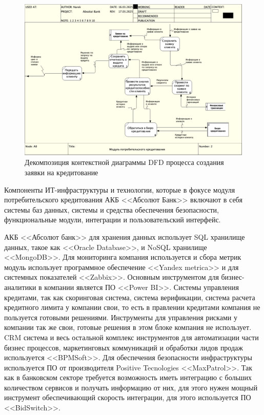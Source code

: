 \documentclass[14pt, a4paper]{extarticle}
\begin{document}
\begin{figure}[H]
	\centering
	\includegraphics[scale=0.33]{dfd1}
	\caption{Декомпозиция контекстной диаграммы DFD процесса создания заявки на
кредитование}
	\label{fig:dfd1}
\end{figure}

Компоненты ИТ-инфраструктуры и технологии, которые в фокусе модуля
потребительского кредитования АКБ <<Абсолют Банк>> включают в себя системы баз
данных, системы и средства обеспечения безопасности, функциональные модули,
интеграции и пользовательский интерфейс.

АКБ <<Абсолют банк>> для хранения данных использует SQL хранилище данных,
такое как <<Oracle Database>>, и NoSQL хранилище <<MongoDB>>. Для мониторинга
компания используется и сбора метрик модуль использует программное обеспечение
<<Yandex metrica>>\;\cite{absolut-infrastructure-usage} и для системных
показателей <<Zabbix>>. Основным инструментом для бизнес-аналитики в компании
является ПО <<Power BI>>. Системы управления
кредитами, так как скоринговая  система, система верификации, система расчета
кредитного лимита у компании свои, то есть в правлении кредитами компания не
пользуется готовыми решениями. Инструменты для управления рисками у компании
так же свои, готовые решения в этом блоке компания не использует. CRM система
и весь остальной комплекс инструментов для автоматизации части
бизнес процессов, маркетинговых коммуникаций и обработки лидов
продаж используется <<BPMSoft>>\;\cite{BPMSoft-usage}. Для обеспечения
безопасности инфраструктуры используется ПО от производителя Positive
Tecnologies <<MaxPatrol>>\;\cite{absolut-MaxPatrol-usage}. Так как в банковском
секторе требуется возможность иметь интеграцию с больших количеством
сервисов и получать информацию от них, для этого нужен мощный инструмент
обеспечивающий скорость интеграции, для этого используется ПО <<BidSwitch>>.
\end{document}
